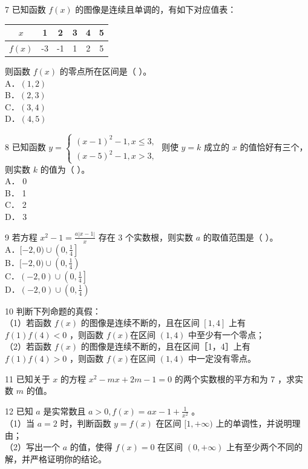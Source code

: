 \documentclass[10pt]{article}
\begin{document}
7 已知函数 \(f(x)\) 的图像是连续且单调的，有如下对应值表：

\begin{center}
\begin{tabular}{|c|c|c|c|c|c|}
\hline
\(x\) & 1 & 2 & 3 & 4 & 5 \\
\hline
\(f(x)\) & -3 & -1 & 1 & 2 & 5 \\
\hline
\end{tabular}
\end{center}

则函数 \(f(x)\) 的零点所在区间是（ ）。\\
A．\((1,2)\)\\
B．\((2,3)\)\\
C．\((3,4)\)\\
D．\((4,5)\)

8 已知函数 \(y=\left\{\begin{array}{l}(x-1)^{2}-1, x \leqslant 3, \\ (x-5)^{2}-1, x>3,\end{array}\right.\) 则使 \(y=k\) 成立的 \(x\) 的值恰好有三个，则实数 \(k\) 的值为（ ）。\\
A． 0\\
B． 1\\
C． 2\\
D． 3

9 若方程 \(x^{2}-1=\frac{a|x-1|}{x}\) 存在 3 个实数根，则实数 \(a\) 的取值范围是（ ）。\\
A．\([-2,0) \cup\left(0, \frac{1}{4}\right]\)\\
B．\([-2,0) \cup\left(0, \frac{1}{4}\right)\)\\
C．\((-2,0) \cup\left(0, \frac{1}{4}\right]\)\\
D．\((-2,0) \cup\left(0, \frac{1}{4}\right)\)

10 判断下列命题的真假：\\
（1）若函数 \(f(x)\) 的图像是连续不断的，且在区间 \([1,4]\) 上有 \(f(1) f(4)<0\) ，则函数 \(f(x)\)在区间 \((1,4)\) 中至少有一个零点；\\
（2）若函数 \(f(x)\) 的图像是连续不断的，且在区间［1，4］上有 \(f(1) f(4)>0\) ，则函数 \(f(x)\)在区间 \((1,4)\) 中一定没有零点。

11 已知关于 \(x\) 的方程 \(x^{2}-m x+2 m-1=0\) 的两个实数根的平方和为 7 ，求实数 \(m\) 的值。

12 已知 \(a\) 是实常数且 \(a>0, f(x)=a x-1+\frac{1}{x^{2}}\) 。\\
（1）当 \(a=2\) 时，判断函数 \(y=f(x)\) 在区间 \([1,+\infty)\) 上的单调性，并说明理由；\\
（2）写出一个 \(a\) 的值，使得 \(f(x)=0\) 在区间 \((0,+\infty)\) 上有至少两个不同的解，并严格证明你的结论。
\end{document}
